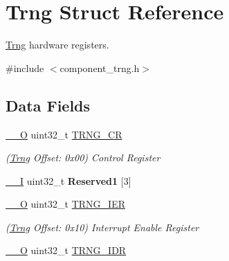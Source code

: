 \hypertarget{structTrng}{}\section{Trng Struct Reference}
\label{structTrng}


\mbox{\hyperlink{structTrng}{Trng}} hardware registers.  




{\ttfamily \#include $<$component\+\_\+trng.\+h$>$}

\subsection*{Data Fields}
\begin{DoxyCompactItemize}
\item 
\mbox{\label{structTrng_a02535e369f9b8a35f5e5f038ecd3da0f}} 
\mbox{\hyperlink{core__cm7_8h_a7e25d9380f9ef903923964322e71f2f6}{\+\_\+\+\_\+O}} uint32\+\_\+t \mbox{\hyperlink{structTrng_a02535e369f9b8a35f5e5f038ecd3da0f}{T\+R\+N\+G\+\_\+\+CR}}
\begin{DoxyCompactList}\small\item\em (\mbox{\hyperlink{structTrng}{Trng}} Offset\+: 0x00) Control Register \end{DoxyCompactList}\item 
\mbox{\label{structTrng_ade8fd8999c374a814f72f960e8de8900}} 
\mbox{\hyperlink{core__cm7_8h_af63697ed9952cc71e1225efe205f6cd3}{\+\_\+\+\_\+I}} uint32\+\_\+t {\bfseries Reserved1} \mbox{[}3\mbox{]}
\item 
\mbox{\label{structTrng_a26bf0f5c76790cda92b47061a8f3ce2d}} 
\mbox{\hyperlink{core__cm7_8h_a7e25d9380f9ef903923964322e71f2f6}{\+\_\+\+\_\+O}} uint32\+\_\+t \mbox{\hyperlink{structTrng_a26bf0f5c76790cda92b47061a8f3ce2d}{T\+R\+N\+G\+\_\+\+I\+ER}}
\begin{DoxyCompactList}\small\item\em (\mbox{\hyperlink{structTrng}{Trng}} Offset\+: 0x10) Interrupt Enable Register \end{DoxyCompactList}\item 
\mbox{\label{structTrng_a1e6b361f447af08930c52e42e0e80c5a}} 
\mbox{\hyperlink{core__cm7_8h_a7e25d9380f9ef903923964322e71f2f6}{\+\_\+\+\_\+O}} uint32\+\_\+t \mbox{\hyperlink{structTrng_a1e6b361f447af08930c52e42e0e80c5a}{T\+R\+N\+G\+\_\+\+I\+DR}}

\end{DoxyCompactItemize}
